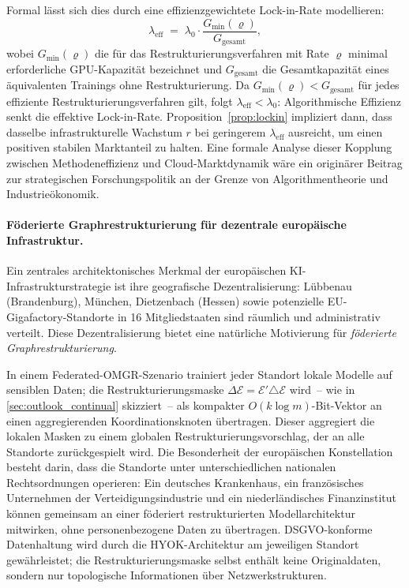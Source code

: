 ﻿\documentclass[12pt, a4paper, openany]{report}
\newcommand{\calE}{\mathcal{E}}
\begin{document}
Formal lässt sich dies durch eine effizienzgewichtete Lock-in-Rate
modellieren:
\[
  \lambda_{\mathrm{eff}}
  \;=\; \lambda_0 \cdot \frac{G_{\min}(\varrho)}{G_{\mathrm{gesamt}}},
\]
wobei $G_{\min}(\varrho)$ die für das Restrukturierungsverfahren mit
Rate $\varrho$ minimal erforderliche GPU-Kapazität bezeichnet und
$G_{\mathrm{gesamt}}$ die Gesamtkapazität eines äquivalenten Trainings
ohne Restrukturierung.  Da $G_{\min}(\varrho) < G_{\mathrm{gesamt}}$
für jedes effiziente Restrukturierungsverfahren gilt, folgt
$\lambda_{\mathrm{eff}} < \lambda_0$: Algorithmische Effizienz senkt
die effektive Lock-in-Rate.  Proposition~\ref{prop:lockin} impliziert
dann, dass dasselbe infrastrukturelle Wachstum $r$ bei geringerem
$\lambda_{\mathrm{eff}}$ ausreicht, um einen positiven stabilen
Marktanteil zu halten.  Eine formale Analyse dieser Kopplung zwischen
Methodeneffizienz und Cloud-Marktdynamik wäre ein originärer Beitrag
zur strategischen Forschungspolitik an der Grenze von
Algorithmentheorie und Industrieökonomik.

\paragraph{Föderierte Graphrestrukturierung für dezentrale
  europäische Infrastruktur.}
Ein zentrales architektonisches Merkmal der europäischen
KI-Infrastrukturstrategie ist ihre geografische Dezentralisierung:
Lübbenau (Brandenburg), München, Dietzenbach (Hessen) sowie potenzielle
EU-Gigafactory-Standorte in 16 Mitgliedstaaten sind räumlich und
administrativ verteilt.  Diese Dezentralisierung bietet eine natürliche
Motivierung für \emph{föderierte Graphrestrukturierung}.

In einem Federated-OMGR-Szenario trainiert jeder Standort lokale
Modelle auf sensiblen Daten; die Restrukturierungsmaske
$\Delta\calE = \calE' \triangle \calE$ wird~-- wie in
\cref{sec:outlook_continual} skizziert~-- als kompakter
$O(k \log m)$-Bit-Vektor an einen aggregierenden Koordinationsknoten
übertragen.  Dieser aggregiert die lokalen Masken zu einem globalen
Restrukturierungsvorschlag, der an alle Standorte zurückgespielt wird.
Die Besonderheit der europäischen Konstellation besteht darin, dass
die Standorte unter unterschiedlichen nationalen Rechtsordnungen
operieren: Ein deutsches Krankenhaus, ein französisches Unternehmen der
Verteidigungsindustrie und ein niederländisches Finanzinstitut können
gemeinsam an einer föderiert restrukturierten Modellarchitektur
mitwirken, ohne personenbezogene Daten zu übertragen.
DSGVO-konforme Datenhaltung wird durch die HYOK-Architektur am
jeweiligen Standort gewährleistet; die Restrukturierungsmaske selbst
enthält keine Originaldaten, sondern nur topologische Informationen
über Netzwerkstrukturen.
\end{document}
